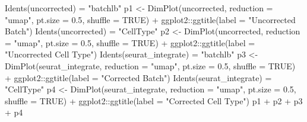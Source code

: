 \documentclass[
]{book}
\newenvironment{Shaded}{\begin{snugshade}}{\end{snugshade}}
\newcommand{\AttributeTok}[1]{\textcolor[rgb]{0.77,0.63,0.00}{#1}}
\newcommand{\ConstantTok}[1]{\textcolor[rgb]{0.00,0.00,0.00}{#1}}
\newcommand{\FloatTok}[1]{\textcolor[rgb]{0.00,0.00,0.81}{#1}}
\newcommand{\FunctionTok}[1]{\textcolor[rgb]{0.00,0.00,0.00}{#1}}
\newcommand{\NormalTok}[1]{#1}
\newcommand{\OtherTok}[1]{\textcolor[rgb]{0.56,0.35,0.01}{#1}}
\newcommand{\SpecialCharTok}[1]{\textcolor[rgb]{0.00,0.00,0.00}{#1}}
\newcommand{\StringTok}[1]{\textcolor[rgb]{0.31,0.60,0.02}{#1}}
\begin{document}
\begin{Shaded}
\begin{Highlighting}[]
\FunctionTok{Idents}\NormalTok{(uncorrected) }\OtherTok{=} \StringTok{"batchlb"}
\NormalTok{p1 }\OtherTok{\textless{}{-}} \FunctionTok{DimPlot}\NormalTok{(uncorrected, }\AttributeTok{reduction =} \StringTok{"umap"}\NormalTok{, }\AttributeTok{pt.size =} \FloatTok{0.5}\NormalTok{, }\AttributeTok{shuffle =} \ConstantTok{TRUE}\NormalTok{) }\SpecialCharTok{+}\NormalTok{ ggplot2}\SpecialCharTok{::}\FunctionTok{ggtitle}\NormalTok{(}\AttributeTok{label =} \StringTok{"Uncorrected Batch"}\NormalTok{)}
\FunctionTok{Idents}\NormalTok{(uncorrected) }\OtherTok{=} \StringTok{"CellType"}
\NormalTok{p2 }\OtherTok{\textless{}{-}} \FunctionTok{DimPlot}\NormalTok{(uncorrected, }\AttributeTok{reduction =} \StringTok{"umap"}\NormalTok{, }\AttributeTok{pt.size =} \FloatTok{0.5}\NormalTok{, }\AttributeTok{shuffle =} \ConstantTok{TRUE}\NormalTok{) }\SpecialCharTok{+}\NormalTok{ ggplot2}\SpecialCharTok{::}\FunctionTok{ggtitle}\NormalTok{(}\AttributeTok{label =} \StringTok{"Uncorrected Cell Type"}\NormalTok{)}
\FunctionTok{Idents}\NormalTok{(seurat\_integrate) }\OtherTok{=} \StringTok{"batchlb"}
\NormalTok{p3 }\OtherTok{\textless{}{-}} \FunctionTok{DimPlot}\NormalTok{(seurat\_integrate, }\AttributeTok{reduction =} \StringTok{"umap"}\NormalTok{, }\AttributeTok{pt.size =} \FloatTok{0.5}\NormalTok{, }\AttributeTok{shuffle =} \ConstantTok{TRUE}\NormalTok{) }\SpecialCharTok{+}\NormalTok{ ggplot2}\SpecialCharTok{::}\FunctionTok{ggtitle}\NormalTok{(}\AttributeTok{label =} \StringTok{"Corrected Batch"}\NormalTok{)}
\FunctionTok{Idents}\NormalTok{(seurat\_integrate) }\OtherTok{=} \StringTok{"CellType"}
\NormalTok{p4 }\OtherTok{\textless{}{-}} \FunctionTok{DimPlot}\NormalTok{(seurat\_integrate, }\AttributeTok{reduction =} \StringTok{"umap"}\NormalTok{, }\AttributeTok{pt.size =} \FloatTok{0.5}\NormalTok{, }\AttributeTok{shuffle =} \ConstantTok{TRUE}\NormalTok{) }\SpecialCharTok{+}\NormalTok{ ggplot2}\SpecialCharTok{::}\FunctionTok{ggtitle}\NormalTok{(}\AttributeTok{label =} \StringTok{"Corrected Cell Type"}\NormalTok{)}
\NormalTok{p1 }\SpecialCharTok{+}\NormalTok{ p2 }\SpecialCharTok{+}\NormalTok{ p3 }\SpecialCharTok{+}\NormalTok{ p4}
\end{Highlighting}
\end{Shaded}
\end{document}
